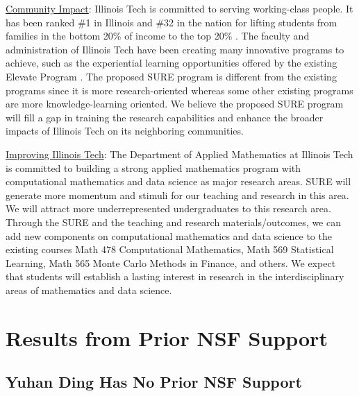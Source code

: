 \documentclass[11pt]{NSFamsart}
\newcommand{\Upara}[1]{\noindent\underline{\upshape #1}:}
\begin{document}
\Upara{Community Impact}
Illinois Tech is committed to serving working-class people. 
It has been ranked \#1 in Illinois and \#32 in the nation for lifting students from families in the bottom 20\% of income to the top 20\% \cite{IITrank}. 
The faculty and administration of Illinois Tech have been creating many innovative programs to achieve, such as the experiential learning opportunities offered by the existing Elevate Program \cite{IITElevate}.
The proposed SURE program is different from the existing programs since it is more research-oriented whereas some other existing programs are more knowledge-learning oriented. 
We believe the proposed SURE program will fill a gap in training the research capabilities and enhance the broader impacts of Illinois Tech on its neighboring communities. 



\Upara{Improving Illinois Tech}
The Department of Applied Mathematics at Illinois Tech is committed to building a strong applied mathematics program with computational mathematics and data science as major research areas. 
SURE will generate more momentum and stimuli for our teaching and research in this area. We will attract more underrepresented undergraduates to this research area. Through the SURE and the teaching and research materials/outcomes, we can add new components on computational mathematics and data science to the existing courses Math 478 Computational Mathematics, Math 569 Statistical Learning, Math 565 Monte Carlo Methods in Finance, and others.
We expect that students will establish a lasting interest in research in the interdisciplinary areas of mathematics and data science.

\section{Results from Prior NSF Support} \label{sec:prior_work}

\subsection{Yuhan Ding Has No Prior NSF Support}
\end{document}
